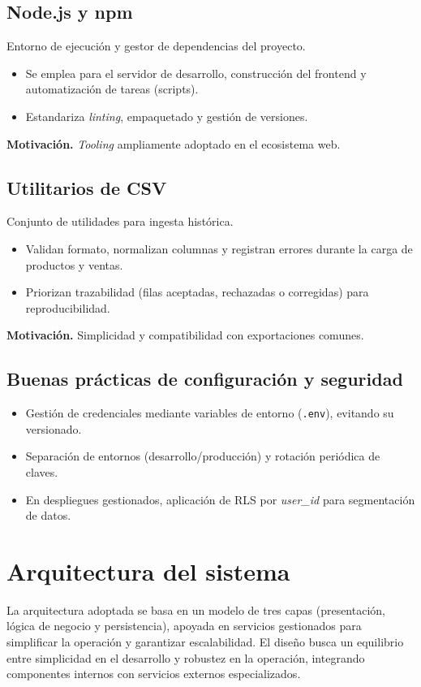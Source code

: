 \subsection{Node.js y npm}
Entorno de ejecución y gestor de dependencias del proyecto.
\begin{itemize}
    \item Se emplea para el servidor de desarrollo, construcción del frontend y automatización de tareas (scripts).
    \item Estandariza \textit{linting}, empaquetado y gestión de versiones.
\end{itemize}
\noindent\textbf{Motivación.} \textit{Tooling} ampliamente adoptado en el ecosistema web.

\subsection{Utilitarios de CSV}
Conjunto de utilidades para ingesta histórica.
\begin{itemize}
    \item Validan formato, normalizan columnas y registran errores durante la carga de productos y ventas.
    \item Priorizan trazabilidad (filas aceptadas, rechazadas o corregidas) para reproducibilidad.
\end{itemize}
\noindent\textbf{Motivación.} Simplicidad y compatibilidad con exportaciones comunes.

\subsection{Buenas prácticas de configuración y seguridad}
\begin{itemize}
    \item Gestión de credenciales mediante variables de entorno (\texttt{.env}), evitando su versionado.
    \item Separación de entornos (desarrollo/producción) y rotación periódica de claves.
    \item En despliegues gestionados, aplicación de RLS por \textit{user\_id} para segmentación de datos.
\end{itemize}




\section{Arquitectura del sistema}

La arquitectura adoptada se basa en un modelo de tres capas 
(presentación, lógica de negocio y persistencia), apoyada en 
servicios gestionados para simplificar la operación y garantizar 
escalabilidad. El diseño busca un equilibrio entre simplicidad 
en el desarrollo y robustez en la operación, integrando 
componentes internos con servicios externos especializados.

